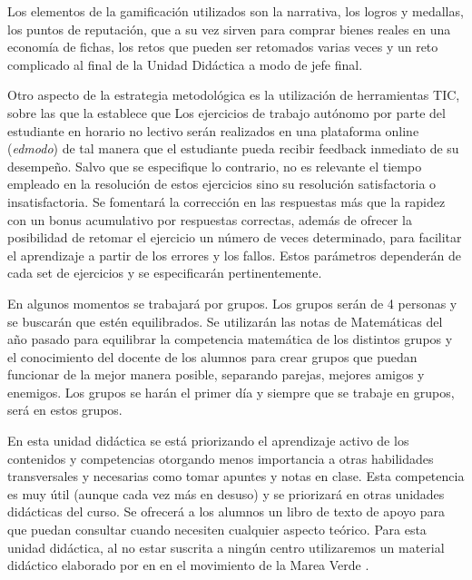 Los elementos de la gamificación utilizados son la narrativa, los logros y medallas, los puntos de reputación, que a su vez sirven para comprar bienes reales en una economía de fichas, los retos que pueden ser retomados varias veces y un reto complicado al final de la Unidad Didáctica a modo de jefe final.


Otro aspecto de la estrategia metodológica es la utilización de herramientas \gls{TIC}, sobre las que la \lomce establece que 
%
Los ejercicios de trabajo autónomo por parte del estudiante en horario no lectivo serán realizados en una plataforma online (\textit{edmodo}) de tal manera que el estudiante pueda recibir feedback inmediato de su desempeño.
%
Salvo que se especifique lo contrario, no es relevante el tiempo empleado en la resolución de estos ejercicios sino su resolución satisfactoria o insatisfactoria.
%
Se fomentará la corrección en las respuestas más que la rapidez con un bonus acumulativo por respuestas correctas, además de ofrecer la posibilidad de retomar el ejercicio un número de veces determinado, para facilitar el aprendizaje a partir de los errores y los fallos.
%
Estos parámetros dependerán de cada set de ejercicios y se especificarán pertinentemente.

En algunos momentos se trabajará por grupos.
%
Los grupos serán de 4 personas y se buscarán que estén equilibrados.
%
Se utilizarán las notas de Matemáticas del año pasado para equilibrar la competencia matemática de los distintos grupos y el conocimiento del docente de los alumnos para crear grupos que puedan funcionar de la mejor manera posible, separando parejas, mejores amigos y enemigos.
%
\label{grupos}
%
Los grupos se harán el primer día y siempre que se trabaje en grupos, será en estos grupos.

En esta unidad didáctica se está priorizando el aprendizaje activo de los contenidos y competencias otorgando menos importancia a otras habilidades transversales y necesarias como tomar apuntes y notas en clase. 
%
Esta competencia es muy útil (aunque cada vez más en desuso) y se priorizará en otras unidades didácticas del curso. 
%
Se ofrecerá a los alumnos un libro de texto de apoyo para que puedan consultar cuando necesiten cualquier aspecto teórico.
%
Para esta unidad didáctica, al no estar suscrita a ningún centro utilizaremos un material didáctico elaborado por \citeauthor{MareaVerde} en \citeyear{MareaVerde} en el movimiento de la Marea Verde \citep{MareaVerde}.


